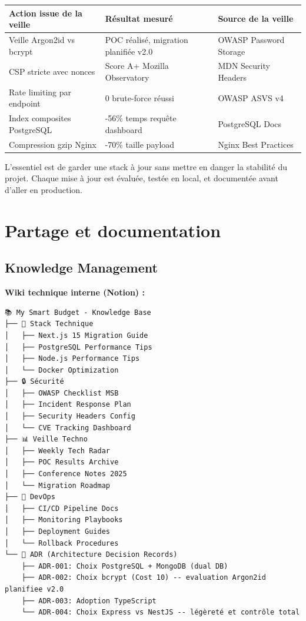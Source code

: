 \begin{tcolorbox}[colback=green!5!white,colframe=green!60!black,title=\textbf{Impact concret de la veille sur My Smart Budget}]
\begin{center}
\small
\begin{tabular}{|p{}|p{}|p{}|}
\hline
\textbf{Action issue de la veille} & \textbf{Résultat mesuré} & \textbf{Source de la veille} \\
\hline
Veille Argon2id vs bcrypt & POC réalisé, migration planifiée v2.0 & OWASP Password Storage \\
\hline
CSP stricte avec nonces & Score A+ Mozilla Observatory & MDN Security Headers \\
\hline
Rate limiting par endpoint & 0 brute-force réussi & OWASP ASVS v4 \\
\hline
Index composites PostgreSQL & -56\% temps requête dashboard & PostgreSQL Docs \\
\hline
Compression gzip Nginx & -70\% taille payload & Nginx Best Practices \\
\hline
\end{tabular}
\end{center}

L'essentiel est de garder une stack à jour sans mettre en danger la stabilité du projet. Chaque mise à jour est évaluée, testée en local, et documentée avant d'aller en production.
\end{tcolorbox}

\section{Partage et documentation}

\subsection{Knowledge Management}

\begin{exemple}
\textbf{Wiki technique interne (Notion) :}
\begin{verbatim}
📚 My Smart Budget - Knowledge Base
├── 🔧 Stack Technique
│   ├── Next.js 15 Migration Guide
│   ├── PostgreSQL Performance Tips
│   ├── Node.js Performance Tips
│   └── Docker Optimization
├── 🔒 Sécurité
│   ├── OWASP Checklist MSB
│   ├── Incident Response Plan
│   ├── Security Headers Config
│   └── CVE Tracking Dashboard
├── 📊 Veille Techno
│   ├── Weekly Tech Radar
│   ├── POC Results Archive
│   ├── Conference Notes 2025
│   └── Migration Roadmap
├── 🚀 DevOps
│   ├── CI/CD Pipeline Docs
│   ├── Monitoring Playbooks
│   ├── Deployment Guides
│   └── Rollback Procedures
└── 📝 ADR (Architecture Decision Records)
    ├── ADR-001: Choix PostgreSQL + MongoDB (dual DB)
    ├── ADR-002: Choix bcrypt (Cost 10) -- evaluation Argon2id planifiee v2.0
    ├── ADR-003: Adoption TypeScript
    └── ADR-004: Choix Express vs NestJS -- légèreté et contrôle total
\end{verbatim}
\end{exemple}

